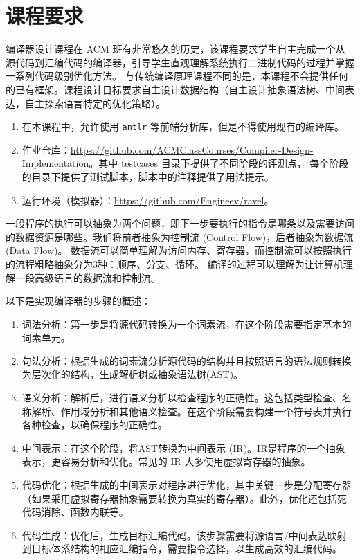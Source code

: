 \chapter{课程要求}

编译器设计课程在 ACM 班有非常悠久的历史，该课程要求学生自主完成一个从源代码到汇编代码的编译器，引导学生直观理解系统执行二进制代码的过程并掌握一系列代码级别优化方法。
与传统编译原理课程不同的是，本课程不会提供任何的已有框架。课程设计目标要求自主设计数据结构（自主设计抽象语法树、中间表达，自主探索语言特定的优化策略）。

\begin{remark}
  \begin{enumerate}
    \item 在本课程中，允许使用 \texttt{antlr} 等前端分析库，但是不得使用现有的编译库。
    \item 作业仓库：\url{https://github.com/ACMClassCourses/Compiler-Design-Implementation}。其中 testcases 目录下提供了不同阶段的评测点，
      每个阶段的目录下提供了测试脚本，脚本中的注释提供了用法提示。
    \item 运行环境（模拟器）：\url{https://github.com/Engineev/ravel}。
  \end{enumerate}
\end{remark}

一段程序的执行可以抽象为两个问题，即下一步要执行的指令是哪条以及需要访问的数据资源是哪些。我们将前者抽象为控制流 (Control Flow)，后者抽象为数据流 (Data Flow)。
数据流可以简单理解为访问内存、寄存器，而控制流可以按照执行的流程粗略抽象分为3种：顺序、分支、循环。
编译的过程可以理解为让计算机理解一段高级语言的数据流和控制流。

以下是实现编译器的步骤的概述：

\begin{enumerate}
    \item 词法分析：第一步是将源代码转换为一个词素流，在这个阶段需要指定基本的词素单元。
    \item 句法分析：根据生成的词素流分析源代码的结构并且按照语言的语法规则转换为层次化的结构，生成解析树或抽象语法树(AST)。
    \item 语义分析：解析后，进行语义分析以检查程序的正确性。这包括类型检查、名称解析、作用域分析和其他语义检查。在这个阶段需要构建一个符号表并执行各种检查，以确保程序的正确性。
    \item 中间表示：在这个阶段，将AST转换为中间表示 (IR)。IR是程序的一个抽象表示，更容易分析和优化。常见的 IR 大多使用虚拟寄存器的抽象。
    \item 代码优化：根据生成的中间表示对程序进行优化，其中关键一步是分配寄存器（如果采用虚拟寄存器抽象需要转换为真实的寄存器）。此外，优化还包括死代码消除、函数内联等。
    \item 代码生成：优化后，生成目标汇编代码。该步骤需要将源语言/中间表达映射到目标体系结构的相应汇编指令，需要指令选择，以生成高效的汇编代码。
\end{enumerate}

